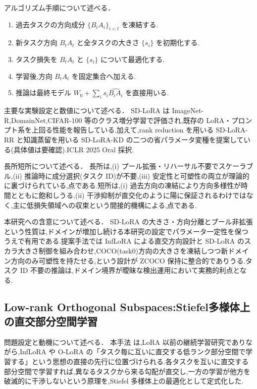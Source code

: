 アルゴリズム手順について述べる．
\begin{enumerate}
\item 過去タスクの方向成分 $\{B_i A_i\}_{i<t}$ を凍結する.
\item 新タスク方向 $B_t A_t$ と全タスクの大きさ $\{s_i\}$ を初期化する.
\item タスク損失を $B_t A_t$ と $\{s_i\}$ について最適化する.
\item 学習後,方向 $B_t A_t$ を固定集合へ加える.
\item 推論は最終モデル $W_0 + \sum_i s_i \widehat{B_i A_i}$ を直接用いる.
\end{enumerate}

主要な実験設定と数値について述べる．
SD-LoRA \cite{sdlora} は ImageNet-R,DomainNet,CIFAR-100 等のクラス増分学習で評価され,既存の LoRA・プロンプト系を上回る性能を報告している.加えて,rank reduction を用いる SD-LoRA-RR と知識蒸留を用いる SD-LoRA-KD の二つの省パラメータ変種を提案している(具体値は要確認).ICLR 2025 Oral 採択.

長所短所について述べる．
長所は,(i) プール拡張・リハーサル不要でスケーラブル,(ii) 推論時に成分選択(タスク ID)が不要,(iii) 安定性と可塑性の両立が理論的に裏づけられている,点である.短所は,(i) 過去方向の凍結により方向多様性が時間とともに飽和しうる,(ii) 干渉抑制が直交化のように陽に保証されるわけではなく,主に低損失領域への収束という間接的機構による,点である.

本研究への含意について述べる．
SD-LoRA の大きさ・方向分離とプール非拡張という性質は,ドメインが増加し続ける本研究の設定でパラメータ一定性を保つうえで有用である.提案手法では InfLoRA による直交方向設計と SD-LoRA のスカラ大きさ制御を組み合わせ,COCO(task0)方向の大きさを凍結しつつ新ドメイン方向のみ可塑性を持たせる,という設計が ZCOCO 保持に整合的でありうる.タスク ID 不要の推論は,ドメイン境界が曖昧な検出運用において実務的利点となる.

\subsection{Low-rank Orthogonal Subspaces:Stiefel多様体上の直交部分空間学習}

問題設定と動機について述べる．
本手法 \cite{lowrankorth} は,LoRA 以前の継続学習研究でありながら,InfLoRA や O-LoRA の「タスク毎に互いに直交する低ランク部分空間で学習する」という思想の直接の先行に位置づけられる.各タスクを互いに直交する部分空間で学習すれば,異なるタスクから来る勾配が直交し,一方の学習が他方を破滅的に干渉しないという原理を,Stiefel 多様体上の最適化として定式化した.

